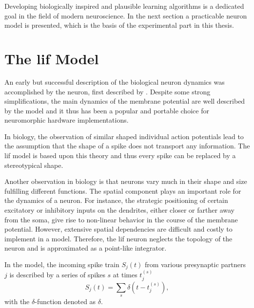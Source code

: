 Developing biologically inspired and plausible learning algorithms is a dedicated goal in the field of modern neuroscience. In the next section a practicable neuron model is presented, which is the basis of the experimental part in this thesis.

\section{The \acrlong{lif} Model}

An early but successful description of the biological neuron dynamics was accomplished by the  neuron, first described by \citealp{lapicque1907recherches}. Despite some strong simplifications, the main dynamics of the membrane potential are well described by the model and it thus has been a popular and portable choice for neuromorphic hardware implementations.

In biology, the observation of similar shaped individual action potentials lead to the assumption that the shape of a spike does not transport any information. The \gls{lif} model is based upon this theory and thus every spike can be replaced by a stereotypical shape.

Another observation in biology is that neurons vary much in their shape and size fulfilling different functions. The spatial component plays an important role for the dynamics of a neuron. For instance, the strategic positioning of certain excitatory or inhibitory inputs on the dendrites, either closer or farther away from the soma, give rise to non-linear behavior in the course of the membrane potential. However, extensive spatial dependencies are difficult and costly to implement in a model. Therefore, the \gls{lif} neuron neglects the topology of the neuron and is approximated as a point-like integrator. 

In the model, the incoming spike train $S_j(t)$ from various presynaptic partners $j$ is described by a series of spikes $s$ at times $t_j^{(s)}$
\begin{equation*}
S_j(t) = \sum_s \delta(t - t_j^{(s)}),
\end{equation*}
with the $\delta$-function denoted as $\delta$. 

